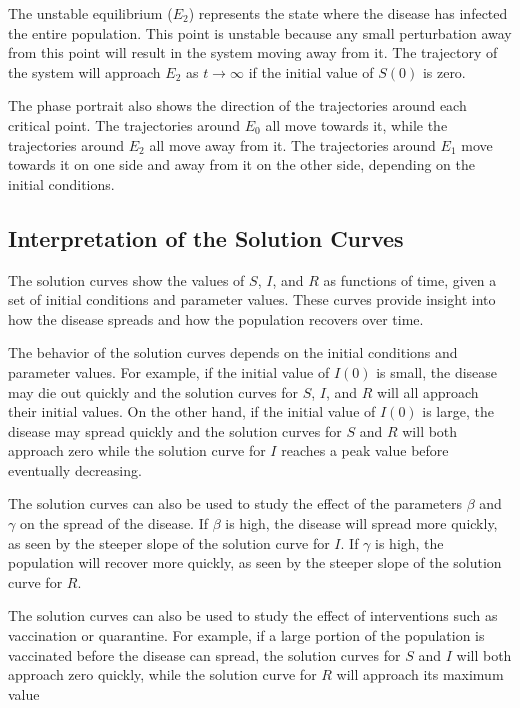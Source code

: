 \documentclass{article}
\begin{document}
The unstable equilibrium ($E_2$) represents the state where the disease has infected the entire population. This point is unstable because any small perturbation away from this point will result in the system moving away from it. The trajectory of the system will approach $E_2$ as $t \to \infty$ if the initial value of $S(0)$ is zero.

The phase portrait also shows the direction of the trajectories around each critical point. The trajectories around $E_0$ all move towards it, while the trajectories around $E_2$ all move away from it. The trajectories around $E_1$ move towards it on one side and away from it on the other side, depending on the initial conditions.

\subsection*{Interpretation of the Solution Curves}

The solution curves show the values of $S$, $I$, and $R$ as functions of time, given a set of initial conditions and parameter values. These curves provide insight into how the disease spreads and how the population recovers over time.

The behavior of the solution curves depends on the initial conditions and parameter values. For example, if the initial value of $I(0)$ is small, the disease may die out quickly and the solution curves for $S$, $I$, and $R$ will all approach their initial values. On the other hand, if the initial value of $I(0)$ is large, the disease may spread quickly and the solution curves for $S$ and $R$ will both approach zero while the solution curve for $I$ reaches a peak value before eventually decreasing.

The solution curves can also be used to study the effect of the parameters $\beta$ and $\gamma$ on the spread of the disease. If $\beta$ is high, the disease will spread more quickly, as seen by the steeper slope of the solution curve for $I$. If $\gamma$ is high, the population will recover more quickly, as seen by the steeper slope of the solution curve for $R$.

The solution curves can also be used to study the effect of interventions such as vaccination or quarantine. For example, if a large portion of the population is vaccinated before the disease can spread, the solution curves for $S$ and $I$ will both approach zero quickly, while the solution curve for $R$ will approach its maximum value
\end{document}
